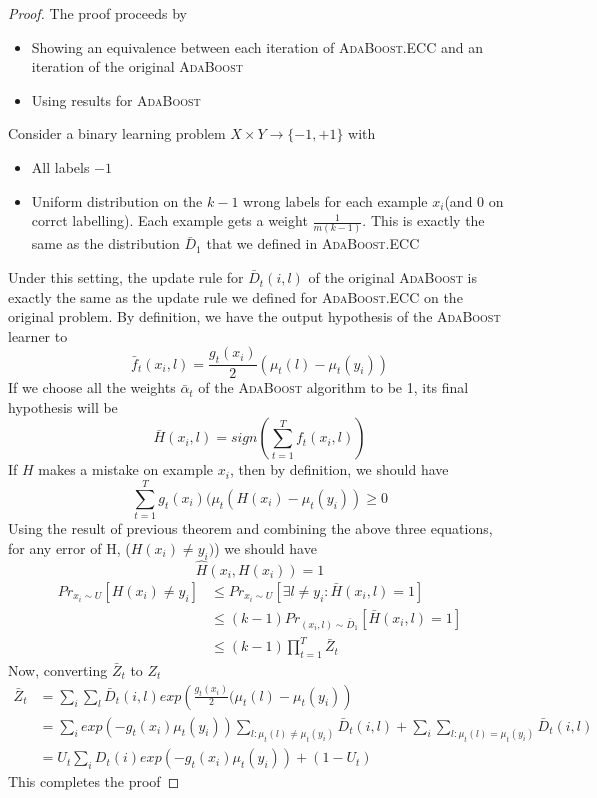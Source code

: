 \documentclass[11pt]{article}
\begin{document}
\begin{proof}
The proof proceeds by 
\begin{itemize}
\item Showing an equivalence between each iteration of \textsc{AdaBoost}.ECC and an iteration of the original \textsc{AdaBoost}
\item Using results for \textsc{AdaBoost}
\end{itemize}
Consider a binary learning problem $X \times Y \rightarrow \{-1,+1\}$ with
\begin{itemize}
\item All labels $-1$
\item Uniform distribution on the $k-1$ wrong labels for each example $x_i$(and 0 on corrct labelling). Each example gets a weight $\frac{1}{m(k-1)}$. This is exactly the same as the distribution $\bar D_1$ that we defined in \textsc{AdaBoost}.ECC
\end{itemize}

Under this setting, the update rule for $\bar D_t(i,l)$ of the original \textsc{AdaBoost} is exactly the same as the update rule we defined for \textsc{AdaBoost}.ECC on the original problem. By definition, we have the output hypothesis of the \textsc{AdaBoost} learner to
$$\bar f_t(x_i,l) = \frac{g_t(x_i)}{2}(\mu_t(l) - \mu_t(y_i))$$
If we choose all the weights $\bar \alpha_t$ of the \textsc{AdaBoost} algorithm to be 1, its final hypothesis will be 
$$\bar H(x_i,l) = sign(\sum_{t=1}^T f_t(x_i, l)) $$
If $H$ makes a mistake on example $x_i$, then by definition, we should have 
$$\sum_{t=1}^T g_t(x_i)(\mu_t(H(x_i) - \mu_t(y_i)) \ge 0$$
Using the result of previous theorem and combining the above three equations, for any error of H, ($H(x_i) \neq y_i)$) we should have $$\hat H(x_i, H(x_i)) = 1$$
\begin{align*}
Pr_{x_i \sim U}[H(x_i) \neq y_i] &\le  Pr_{x_i \sim U}[\exists l \neq y_i : \bar H(x_i, l) = 1]\\
&\le (k-1) Pr_{(x_i, l) \sim \bar D_1} [\bar H(x_i, l) = 1]\\
&\le (k-1) \prod_{t=1}^T \bar Z_t
\end{align*}
Now, converting $\bar Z_t$ to $Z_t$
\begin{align*}
\bar Z_t &= \sum_i \sum_l \bar D_t(i,l) exp\left(\frac{g_t(x_i)}{2}(\mu_t(l)-\mu_t(y_i)\right)\\
&= \sum_i exp(-g_t(x_i)\mu_t(y_i)) \sum_{l: \mu_t(l) \neq \mu_t(y_i)} \bar D_t(i,l) + \sum_i \sum_{l: \mu_t(l) = \mu_t(y_i)} \bar D_t(i,l)\\
&= U_t \sum_i D_t(i) exp(-g_t(x_i) \mu_t(y_i)) + (1-U_t)
\end{align*}
This completes the proof
\end{proof}
\end{document}
